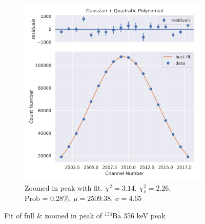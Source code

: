 \documentclass[11pt,a4paper]{article}
\newcommand{\element}[2]{$^{#2}\textrm{#1}$}
\begin{document}
\begin{figure}[H]
\begin{subfigure}{.5\linewidth}
    \includegraphics[width=\linewidth]{./Images/Barium133/Quad/Quad_6_Zoom.png}
    \caption{Zoomed in peak with fit. $\chi^2 = 3.14$, $\chi^2_\nu = 2.26$, \\ Prob = 0.28\%, $\mu = 2509.38$, $\sigma = 4.65$}
  \end{subfigure}
  \caption{Fit of full \& zoomed in peak of \element{Ba}{133} 356 keV peak}
\end{figure}
\end{document}
